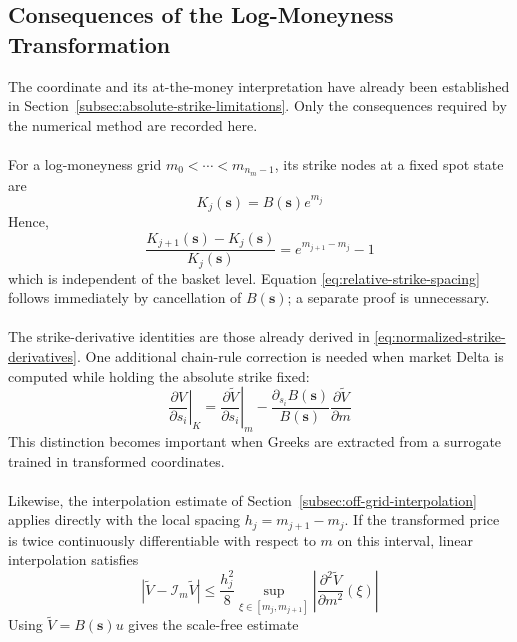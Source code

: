 \documentclass{article}
\numberwithin{equation}{subsection}
\theoremstyle{definition}
\theoremstyle{remark}
\begin{document}
\subsection{Consequences of the Log-Moneyness Transformation}
\label{subsec:log-moneyness-consequences}
The coordinate and its at-the-money interpretation have already been
established in Section~\ref{subsec:absolute-strike-limitations}. Only the
consequences required by the numerical method are recorded here.\\
\\
For a log-moneyness grid
\(m_0<\cdots<m_{n_m-1}\), its strike nodes at a fixed spot state are
\begin{equation}
K_j(\boldsymbol{s})
=
B(\boldsymbol{s})e^{m_j}
\end{equation}
Hence,
\begin{equation}
\frac{
K_{j+1}(\boldsymbol{s})-K_j(\boldsymbol{s})
}{
K_j(\boldsymbol{s})
}
=
e^{m_{j+1}-m_j}-1
\label{eq:relative-strike-spacing}
\end{equation}
which is independent of the basket level. Equation
\eqref{eq:relative-strike-spacing} follows immediately by cancellation of
\(B(\boldsymbol{s})\); a separate proof is unnecessary.\\
\\
The strike-derivative identities are those already derived in
\eqref{eq:normalized-strike-derivatives}. One additional chain-rule correction
is needed when market Delta is computed while holding the absolute strike
fixed:
\begin{equation}
\left.
\frac{\partial V}{\partial s_i}
\right|_K
=
\left.
\frac{\partial\widetilde{V}}{\partial s_i}
\right|_m
-
\frac{
\partial_{s_i}B(\boldsymbol{s})
}{
B(\boldsymbol{s})
}
\frac{\partial\widetilde{V}}{\partial m}
\label{eq:market-delta-correction}
\end{equation}
This distinction becomes important when Greeks are extracted from a surrogate
trained in transformed coordinates.\\
\\
Likewise, the interpolation estimate of
Section~\ref{subsec:off-grid-interpolation} applies directly with the local
spacing \(h_j=m_{j+1}-m_j\). If the transformed price is twice continuously differentiable with respect to $m$ on this interval, linear interpolation satisfies
\[
\left|
\widetilde{V}
-
\mathcal{I}_m\widetilde{V}
\right|
\leq
\frac{h_j^2}{8}
\sup_{\xi\in[m_j,m_{j+1}]}
\left|
\frac{\partial^2\widetilde{V}}{\partial m^2}(\xi)
\right|
\]
Using $\widetilde{V}=B(\boldsymbol{s})u$ gives the scale-free estimate
\end{document}
